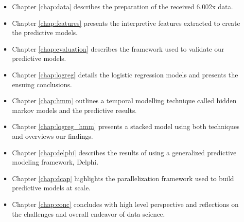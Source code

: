 \begin{itemize}
\item Chapter \ref{chap:data} describes the preparation of the received 6.002x data.
\item Chapter \ref{chap:features} presents the interpretive features extracted to create the predictive models.
\item Chapter \ref{chap:evaluation} describes the framework used to validate our predictive models.
\item Chapter \ref{chap:logreg} details the logistic regression models and presents the ensuing conclusions.
\item Chapter \ref{chap:hmm} outlines a temporal modelling technique called hidden markov models and the predictive results.
\item Chapter \ref{chap:logreg_hmm} presents a stacked model using both techniques and overviews our findings.
\item Chapter \ref{chap:delphi} describes the results of using a generalized predictive modeling framework, Delphi.
\item Chapter \ref{chap:dcap} highlights the parallelization framework used to build predictive models at scale.
\item Chapter \ref{chap:conc} concludes with high level perspective and reflections on the challenges and overall endeavor of data science.
\end{itemize}